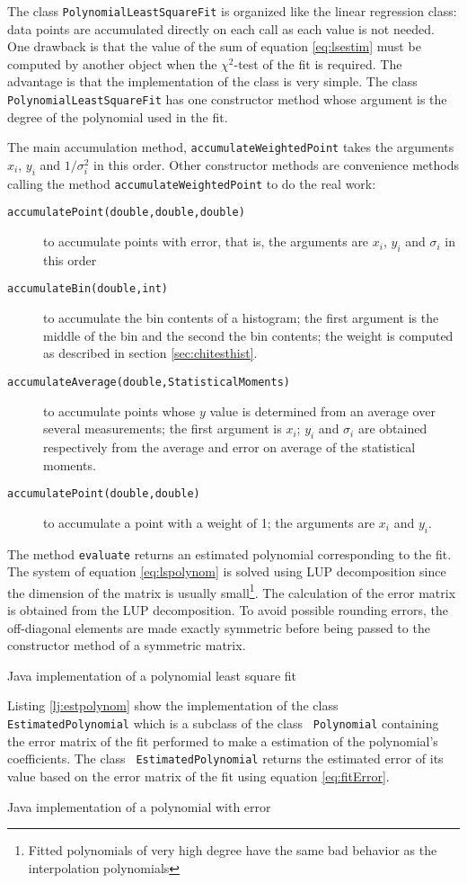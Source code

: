\documentclass[twoside]{book}
\begin{document}
The class {\tt PolynomialLeastSquareFit} is organized like the
linear regression class: data points are accumulated directly on
each call as each value is not needed. One drawback is that the
value of the sum of equation \ref{eq:lsestim} must be computed by
another object when the $\chi^2$-test of the fit is required. The
advantage is that the implementation of the class is very simple.
The class {\tt PolynomialLeastSquareFit} has one constructor
method whose argument is the degree of the polynomial used in the
fit.

The main accumulation method, {\tt accumulateWeightedPoint} takes
the arguments $x_i$, $y_i$ and $1/\sigma_i^2$ in this order. Other
constructor methods are convenience methods calling the method
{\tt accumulateWeightedPoint} to do the real work:
\begin{description}
  \item[\tt accumulatePoint(double,double,double)] to accumulate
  points with error, that is, the arguments are $x_i$, $y_i$ and $\sigma_i$ in this order
  \item[\tt accumulateBin(double,int)] to accumulate the bin
  contents of a histogram; the first argument is the middle of the
  bin and the second the bin contents; the weight is computed as
  described in section \ref{sec:chitesthist}.
  \item[\tt accumulateAverage(double,StatisticalMoments)] to
  accumulate points whose $y$ value is determined from an average
  over several measurements; the first argument is $x_i$; $y_i$ and
  $\sigma_i$ are obtained respectively from the average and error on average of
  the statistical moments.
  \item[\tt accumulatePoint(double,double)]  to accumulate a
  point with a weight of 1; the arguments are $x_i$ and $y_i$.
\end{description}
The method {\tt evaluate} returns an estimated polynomial
corresponding to the fit. The system of equation
\ref{eq:lspolynom} is solved using LUP decomposition since the
dimension of the matrix is usually small\footnote{Fitted
polynomials of very high degree have the same bad behavior as the
interpolation polynomials}. The calculation of the error matrix is
obtained from the LUP decomposition. To avoid possible rounding
errors, the off-diagonal elements are made exactly symmetric
before being passed to the constructor method of a symmetric
matrix.
\begin{listing} Java implementation of a polynomial least square fit \label{lj:lspolynom}

\end{listing}
Listing \ref{lj:estpolynom} show the implementation of the class
{\tt EstimatedPolynomial} which is a subclass of the class {\tt
Polynomial} containing the error matrix of the fit performed to
make a estimation of the polynomial's coefficients. The class {\tt
EstimatedPolynomial} returns the estimated error of its value
based on the error matrix of the fit using equation
\ref{eq:fitError}.
\begin{listing} Java implementation of a polynomial with error \label{lj:estpolynom}

\end{listing}
\end{document}
